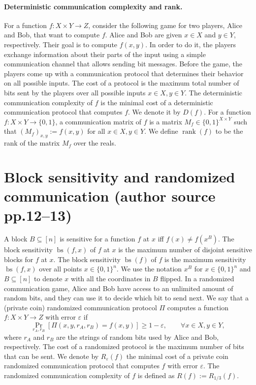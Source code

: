 \documentclass[10pt,a4paper]{article}
\newcommand{\bits}{\{0,1\}}
\begin{document}
\paragraph{Deterministic communication complexity and rank.} For a function $f:X\times Y\to Z$, consider the following game for two players, Alice and Bob, that want to compute $f$. Alice and Bob are given $x\in X$ and $y\in Y$, respectively. Their goal is to compute $f(x,y)$. In order to do it, the players exchange information about their parts of the input using a simple communication channel that allows sending bit messages. Before the game, the players come up with a communication protocol that determines their behavior on all possible inputs. The cost of a protocol is the maximum total number of bits sent by the players over all possible inputs $x\in X,y\in Y$. The deterministic communication complexity of $f$ is the minimal cost of a deterministic communication protocol that computes $f$. We denote it by $D(f)$.
For a function $f:X\times Y\to\bits$, a communication matrix of $f$ is a matrix $M_f\in\bits^{X\times Y}$ such that $(M_f)_{x,y}:=f(x,y)$ for all $x\in X,y\in Y$. We define $\operatorname{rank}(f)$ to be the rank of the matrix $M_f$ over the reals.

\section*{Block sensitivity and randomized communication (author source pp.12--13)}
A block $B\subseteq[n]$ is sensitive for a function $f$ at $x$ iff $f(x)\ne f(x^B)$. The block sensitivity $\operatorname{bs}(f,x)$ of $f$ at $x$ is the maximum number of disjoint sensitive blocks for $f$ at $x$. The block sensitivity $\operatorname{bs}(f)$ of $f$ is the maximum sensitivity $\operatorname{bs}(f,x)$ over all points $x\in\bits^n$.
We use the notation $x^B$ for $x\in\bits^n$ and $B\subseteq[n]$ to denote $x$ with all the coordinates in $B$ flipped.
In a randomized communication game, Alice and Bob have access to an unlimited amount of random bits, and they can use it to decide which bit to send next. We say that a (private coin) randomized communication protocol $\Pi$ computes a function $f:X\times Y\to Z$ with error $\varepsilon$ if
\[\Pr_{r_A,r_B}[\Pi(x,y,r_A,r_B)=f(x,y)]\ge1-\varepsilon,\qquad\forall x\in X,y\in Y,\]
where $r_A$ and $r_B$ are the strings of random bits used by Alice and Bob, respectively. The cost of a randomized protocol is the maximum number of bits that can be sent. We denote by $R_\varepsilon(f)$ the minimal cost of a private coin randomized communication protocol that computes $f$ with error $\varepsilon$. The randomized communication complexity of $f$ is defined as $R(f):=R_{1/3}(f)$.
\end{document}
